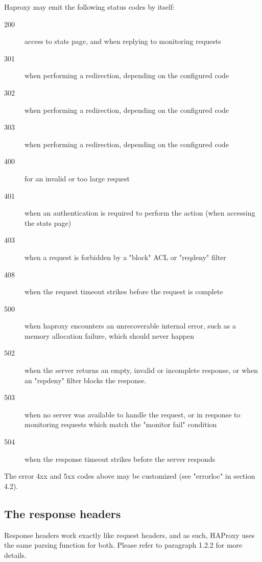 Haproxy may emit the following status codes by itself:
\begin{description}
\item[200] access to stats page, and when replying to monitoring requests
\item[301] when performing a redirection, depending on the configured code
\item[302] when performing a redirection, depending on the configured code
\item[303] when performing a redirection, depending on the configured code
\item[400] for an invalid or too large request
\item[401] when an authentication is required to perform the action (when
        accessing the stats page)
\item[403] when a request is forbidden by a "block" ACL or "reqdeny" filter
\item[408] when the request timeout strikes before the request is complete
\item[500] when haproxy encounters an unrecoverable internal error, such as a
        memory allocation failure, which should never happen
\item[502] when the server returns an empty, invalid or incomplete response, or
        when an "rspdeny" filter blocks the response.
\item[503] when no server was available to handle the request, or in response to
        monitoring requests which match the "monitor fail" condition
\item[504] when the response timeout strikes before the server responds
\end{description}

The error 4xx and 5xx codes above may be customized (see "errorloc" in section
4.2).

\subsection{The response headers}
Response headers work exactly like request headers, and as such, HAProxy uses
the same parsing function for both. Please refer to paragraph 1.2.2 for more
details.
